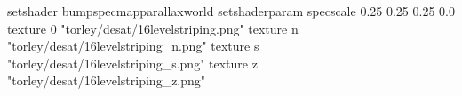 setshader bumpspecmapparallaxworld
setshaderparam specscale 0.25 0.25 0.25 0.0
texture 0 "torley/desat/16levelstriping.png"
texture n "torley/desat/16levelstriping_n.png"
texture s "torley/desat/16levelstriping_s.png"
texture z "torley/desat/16levelstriping_z.png"

